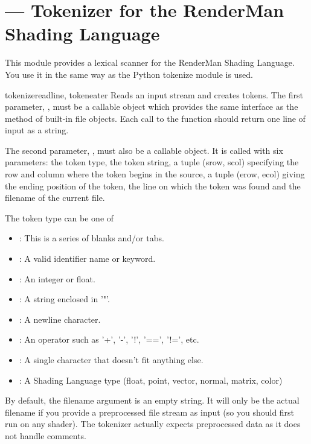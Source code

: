 \section{ ---
          Tokenizer for the RenderMan Shading Language}


This module provides a lexical scanner for the RenderMan Shading
Language. You use it in the same way as the Python tokenize module is
used.

\begin{funcdesc}{tokenize}{readline, tokeneater}
Reads an input stream and creates tokens. The first parameter,
, must be a callable object which provides the same interface
as the  method of built-in file objects. Each call to the
function should return one line of input as a string.

The second parameter, , must also be a callable
object. It is called with six parameters: the token type, the token
string, a tuple (srow, scol) specifying the row and column where the
token begins in the source, a tuple (erow, ecol) giving the ending
position of the token, the line on which the token was found and the
filename of the current file.

The token type can be one of 

\begin{itemize}
\item {}: This is a series of blanks and/or tabs. 
\item {}: A valid identifier name or keyword. 
\item {}: An integer or float. 
\item {}: A string enclosed in '"'. 
\item {}: A newline character. 
\item {}: An operator such as '+', '-', '!', '==', '!=', etc. 
\item {}: A single character that doesn't fit anything else. 
\item {}: A Shading Language type (float, point, vector, normal, matrix, color) 
\end{itemize}

By default, the filename argument is an empty string. It will only be
the actual filename if you provide a preprocessed file stream as input
(so you should first run  on any shader). The tokenizer
actually expects preprocessed data as it does not handle comments.
\end{funcdesc}
